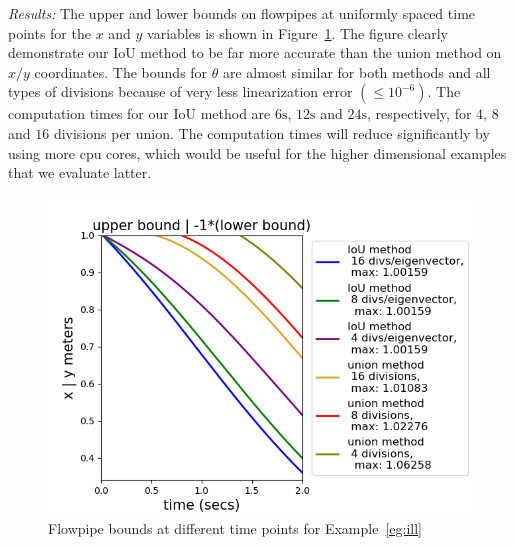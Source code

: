 \emph{Results:}  The upper and lower bounds on flowpipes at uniformly spaced time
points for the $x$ and $y$ variables is
shown in Figure~\ref{fig:ill}.  The figure clearly demonstrate our IoU
method to be far more accurate than the union method on $x/y$
coordinates.  The bounds for $\theta$ are almost similar for both
methods and all types of divisions because of very less linearization
error $(\le 10^{-6})$.  The computation times for our IoU method are $6\si{\second}$, $12\si{\second}$ and $24\si{\second}$, respectively, for $4$, $8$ and $16$ divisions
per union.  The computation times will reduce significantly by using
more cpu cores, which would be useful for the higher dimensional
examples that we evaluate latter.
%
\begin{figure}
  \includegraphics[scale = 0.7]{illImages/Ub.png}
  \caption{Flowpipe bounds at different time points for
    Example~\ref{eg:ill}}
  \label{fig:ill}
\end{figure}
%
